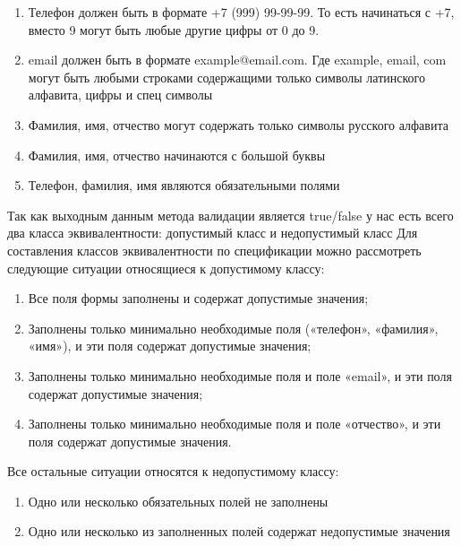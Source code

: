 \documentclass[a4paper,article,14pt]{extarticle}
\begin{document}
\begin{enumerate}
    \item Телефон должен быть в формате +7 (999) 99-99-99. То есть начинаться с +7, вместо 9
    могут быть любые другие цифры от 0 до 9.
    \item email должен быть в формате example@email.com. Где example, email, com могут быть
    любыми строками содержащими только символы латинского алфавита, цифры и спец символы
    \item Фамилия, имя, отчество могут содержать только символы русского алфавита
    \item Фамилия, имя, отчество начинаются с большой буквы
    \item Телефон, фамилия, имя являются обязательными полями
\end{enumerate}

Так как выходным данным метода валидации является true/false у нас есть всего
два класса эквивалентности: допустимый класс и недопустимый класс
Для составления классов эквивалентности по спецификации можно рассмотреть
следующие ситуации относящиеся к допустимому классу:

\begin{enumerate}
    \item Все поля формы заполнены и содержат допустимые значения;
    \item Заполнены только минимально необходимые поля («телефон», «фамилия», «имя»), и
    эти поля содержат допустимые значения;
    \item Заполнены только минимально необходимые поля и поле «email», и эти поля содержат
    допустимые значения;
    \item Заполнены только минимально необходимые поля и поле «отчество», и эти поля
    содержат допустимые значения.
\end{enumerate}

Все остальные ситуации относятся к недопустимому классу:
\begin{enumerate}
    \item Одно или несколько обязательных полей не заполнены
    \item Одно или несколько из заполненных полей содержат недопустимые значения
\end{enumerate}
\end{document}
